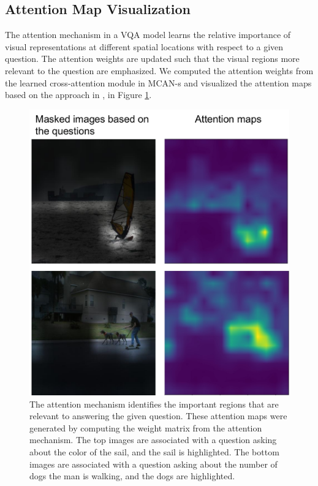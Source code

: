 \documentclass[letterpaper]{article} %
\begin{document}
\subsection{Attention Map Visualization}
The attention mechanism in a VQA model learns the relative importance of visual representations at different spatial locations with respect to a given question. The attention weights are updated such that the visual regions more relevant to the question are emphasized. We computed the attention weights from the learned cross-attention module in MCAN-s and visualized the attention maps based on the approach in \cite{san}, in Figure \ref{fig:attention}.

\begin{figure}[!t]
    \centering
    \includegraphics[width=0.6\linewidth]{figures/attention.pdf}
    \caption{The attention mechanism identifies the important regions that are relevant to answering the given question. These attention maps were generated by computing the weight matrix from the attention mechanism. The top images are associated with a question asking about the color of the sail, and the sail is highlighted. The bottom images are associated with a question asking about the number of dogs the man is walking, and the dogs are highlighted.}
    \label{fig:attention}
\end{figure}
\end{document}
